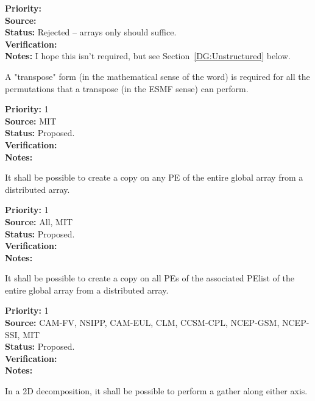 \begin{reqlist}
{\bf Priority:} \\
{\bf Source:} \\
{\bf Status:} Rejected -- arrays only should suffice. \\
{\bf Verification:} \\
{\bf Notes:} I hope this isn't required, but see
  Section~\ref{DG:Unstructured} below.
\end{reqlist}

A "transpose" form (in the mathematical sense of the word) is required
for all the permutations that a transpose (in the ESMF sense) can perform.
\begin{reqlist}
{\bf Priority:} 1 \\ 
{\bf Source:}  MIT \\
{\bf Status:} Proposed. \\
{\bf Verification:} \\
{\bf Notes:}
\end{reqlist}


It shall be possible to create a copy on any PE of the entire global
array from a distributed array.

\begin{reqlist}
{\bf Priority:} 1 \\  
{\bf Source:} All, MIT \\
{\bf Status:} Proposed. \\
{\bf Verification:} \\
{\bf Notes:} 
\end{reqlist}


It shall be possible to create a copy on all PEs of the associated
PElist of the entire global array from a distributed array.

\begin{reqlist}
{\bf Priority:} 1 \\ 
{\bf Source:} CAM-FV, NSIPP, CAM-EUL, CLM, CCSM-CPL, NCEP-GSM, NCEP-SSI, MIT \\
{\bf Status:} Proposed. \\
{\bf Verification:} \\
{\bf Notes:} 
\end{reqlist}

 \label{DG:PartGather}

In a 2D decomposition, it shall be possible to perform a gather along
either axis.

